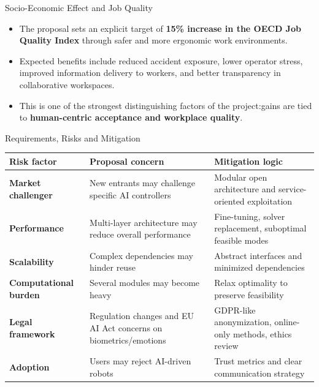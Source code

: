 \documentclass[aspectratio=169,10pt]{beamer}
\begin{document}
\begin{frame}{Socio-Economic Effect and Job Quality}

\begin{itemize}
  \item The proposal sets an explicit target of \textbf{15\% increase in the OECD Job Quality Index} through safer and more ergonomic work environments.
  \item Expected benefits include reduced accident exposure, lower operator stress, improved information delivery to workers, and better transparency in collaborative workspaces.
  \item This is one of the strongest distinguishing factors of the project:\@productivity gains are tied to \textbf{human-centric acceptance and workplace quality}. 
\end{itemize}

\end{frame}


\begin{frame}{Requirements, Risks and Mitigation}

\small
\begin{tabularx}{\textwidth}{>{\bfseries}p{} X X}
\toprule
Risk factor & Proposal concern & Mitigation logic \\
\midrule
Market challenger & New entrants may challenge specific AI controllers & Modular open architecture and service-oriented exploitation \\
Performance & Multi-layer architecture may reduce overall performance & Fine-tuning, solver replacement, suboptimal feasible modes \\
Scalability & Complex dependencies may hinder reuse & Abstract interfaces and minimized dependencies \\
Computational burden & Several modules may become heavy & Relax optimality to preserve feasibility \\
Legal framework & Regulation changes and EU AI Act concerns on biometrics/emotions & GDPR-like anonymization, online-only methods, ethics review \\
Adoption & Users may reject AI-driven robots & Trust metrics and clear communication strategy \\
\bottomrule
\end{tabularx}

\end{frame}
\end{document}
